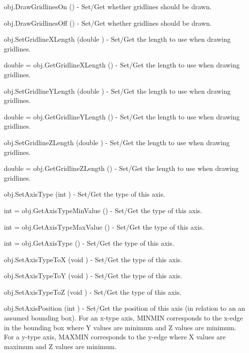 \begin{DoxyItemize}
\item {\ttfamily obj.\-Draw\-Gridlines\-On ()} -\/ Set/\-Get whether gridlines should be drawn.  
\item {\ttfamily obj.\-Draw\-Gridlines\-Off ()} -\/ Set/\-Get whether gridlines should be drawn.  
\item {\ttfamily obj.\-Set\-Gridline\-X\-Length (double )} -\/ Set/\-Get the length to use when drawing gridlines.  
\item {\ttfamily double = obj.\-Get\-Gridline\-X\-Length ()} -\/ Set/\-Get the length to use when drawing gridlines.  
\item {\ttfamily obj.\-Set\-Gridline\-Y\-Length (double )} -\/ Set/\-Get the length to use when drawing gridlines.  
\item {\ttfamily double = obj.\-Get\-Gridline\-Y\-Length ()} -\/ Set/\-Get the length to use when drawing gridlines.  
\item {\ttfamily obj.\-Set\-Gridline\-Z\-Length (double )} -\/ Set/\-Get the length to use when drawing gridlines.  
\item {\ttfamily double = obj.\-Get\-Gridline\-Z\-Length ()} -\/ Set/\-Get the length to use when drawing gridlines.  
\item {\ttfamily obj.\-Set\-Axis\-Type (int )} -\/ Set/\-Get the type of this axis.  
\item {\ttfamily int = obj.\-Get\-Axis\-Type\-Min\-Value ()} -\/ Set/\-Get the type of this axis.  
\item {\ttfamily int = obj.\-Get\-Axis\-Type\-Max\-Value ()} -\/ Set/\-Get the type of this axis.  
\item {\ttfamily int = obj.\-Get\-Axis\-Type ()} -\/ Set/\-Get the type of this axis.  
\item {\ttfamily obj.\-Set\-Axis\-Type\-To\-X (void )} -\/ Set/\-Get the type of this axis.  
\item {\ttfamily obj.\-Set\-Axis\-Type\-To\-Y (void )} -\/ Set/\-Get the type of this axis.  
\item {\ttfamily obj.\-Set\-Axis\-Type\-To\-Z (void )} -\/ Set/\-Get the type of this axis.  
\item {\ttfamily obj.\-Set\-Axis\-Position (int )} -\/ Set/\-Get the position of this axis (in relation to an an assumed bounding box). For an x-\/type axis, M\-I\-N\-M\-I\-N corresponds to the x-\/edge in the bounding box where Y values are minimum and Z values are minimum. For a y-\/type axis, M\-A\-X\-M\-I\-N corresponds to the y-\/edge where X values are maximum and Z values are minimum.



\end{DoxyItemize}
